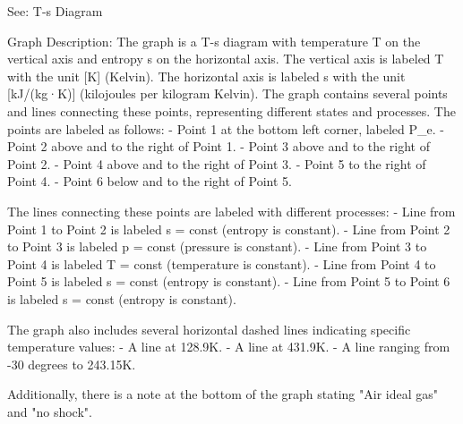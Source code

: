 See: T-s Diagram

Graph Description:
The graph is a T-s diagram with temperature T on the vertical axis and entropy s on the horizontal axis. The vertical axis is labeled T with the unit [K] (Kelvin). The horizontal axis is labeled s with the unit [kJ/(kg·K)] (kilojoules per kilogram Kelvin). The graph contains several points and lines connecting these points, representing different states and processes. The points are labeled as follows:
- Point 1 at the bottom left corner, labeled P_e.
- Point 2 above and to the right of Point 1.
- Point 3 above and to the right of Point 2.
- Point 4 above and to the right of Point 3.
- Point 5 to the right of Point 4.
- Point 6 below and to the right of Point 5.

The lines connecting these points are labeled with different processes:
- Line from Point 1 to Point 2 is labeled s = const (entropy is constant).
- Line from Point 2 to Point 3 is labeled p = const (pressure is constant).
- Line from Point 3 to Point 4 is labeled T = const (temperature is constant).
- Line from Point 4 to Point 5 is labeled s = const (entropy is constant).
- Line from Point 5 to Point 6 is labeled s = const (entropy is constant).

The graph also includes several horizontal dashed lines indicating specific temperature values:
- A line at 128.9K.
- A line at 431.9K.
- A line ranging from -30 degrees to 243.15K.

Additionally, there is a note at the bottom of the graph stating "Air ideal gas" and "no shock".
